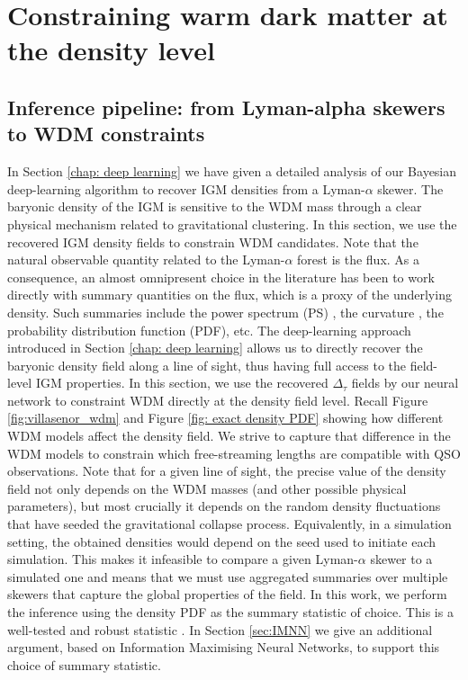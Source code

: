 \chapter{Constraining warm dark matter at the density level}\label{sec: inference pipeline}


\section{Inference pipeline: from Lyman-alpha skewers to WDM constraints}\label{sec: inference algo}

In Section \ref{chap: deep learning} we have given a detailed analysis of our Bayesian deep-learning algorithm to recover IGM densities from a Lyman-$\alpha$ skewer. The baryonic density of the IGM is sensitive to the WDM mass through a clear physical mechanism related to gravitational clustering. In this section, we use the recovered IGM density fields to constrain WDM candidates. Note that the natural observable quantity related to the Lyman-$\alpha$ forest is the flux. As a consequence, an almost omnipresent choice in the literature has been to work directly with summary quantities on the flux, which is a proxy of the underlying density. Such summaries include the power spectrum (PS) \cite{Villasenor_2023}, the curvature \cite{Becker_2010}, the probability distribution function (PDF), etc. The deep-learning approach introduced in Section \ref{chap: deep learning} allows us to directly recover the baryonic density field along a line of sight, thus having full access to the field-level IGM properties. In this section, we use the recovered $\Delta_\tau$ fields by our neural network to constraint WDM directly at the density field level. Recall Figure \ref{fig:villasenor_wdm} and Figure \ref{fig: exact density PDF} showing how different WDM models affect the density field. We strive to capture that difference in the WDM models to constrain which free-streaming lengths are compatible with QSO observations. Note that for a given line of sight, the precise value of the density field not only depends on the WDM masses (and other possible physical parameters), but most crucially it depends on the random density fluctuations that have seeded the gravitational collapse process. Equivalently, in a simulation setting, the obtained densities would depend on the seed used to initiate each simulation. This makes it infeasible to compare a given Lyman-$\alpha$ skewer to a simulated one and means that we must use aggregated summaries over multiple skewers that capture the global properties of the field. In this work, we perform the inference using the density PDF as the summary statistic of choice. This is a well-tested and robust statistic \cite{Gaikwad_2021}. In Section \ref{sec:IMNN} we give an additional argument, based on Information Maximising Neural Networks, to support this choice of summary statistic.


